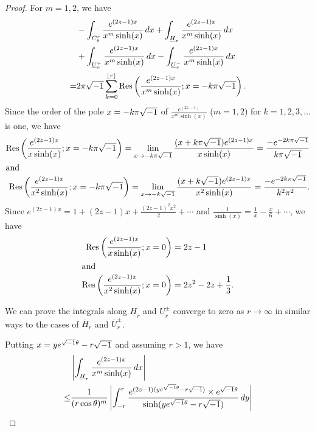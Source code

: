 \begin{proof}
\par
For $m=1,2$, we have
\begin{equation}\label{eq:L1_residue_negative}
\begin{split}
  &-\int_{C_{\theta}^{r}}\frac{e^{(2z-1)x}}{x^m\sinh(x)}\,dx
  +
  \int_{\underline{H}_{r}}\frac{e^{(2z-1)x}}{x^m\sinh(x)}\,dx
  \\
  &+
  \int_{\underline{U}_{r}^{+}}\frac{e^{(2z-1)x}}{x^m\sinh(x)}\,dx
  -
  \int_{\underline{U}_{r}^{-}}\frac{e^{(2z-1)x}}{x^m\sinh(x)}\,dx
  \\
  =&
  2\pi\sqrt{-1}
  \sum_{k=0}^{\lfloor{r}\rfloor}
  \operatorname{Res}\left(\frac{e^{(2z-1)x}}{x^m\sinh(x)};x=-k\pi\sqrt{-1}\right).
\end{split}
\end{equation}
Since the order of the pole $x=-k\pi\sqrt{-1}$ of $\frac{e^{(2z-1)}}{x^m\sinh(x)}$ ($m=1,2$) for $k=1,2,3,\dots$ is one, we have
\begin{align*}
  \operatorname{Res}\left(\frac{e^{(2z-1)x}}{x\sinh(x)};x=-k\pi\sqrt{-1}\right)
  =
  \lim_{x\to-k\pi\sqrt{-1}}\frac{(x+k\pi\sqrt{-1})e^{(2z-1)x}}{x\sinh(x)}
  =
  \frac{-e^{-2k\pi\sqrt{-1}}}{k\pi\sqrt{-1}}
  \\
  \intertext{and}
  \operatorname{Res}\left(\frac{e^{(2z-1)x}}{x^2\sinh(x)};x=-k\pi\sqrt{-1}\right)
  =
  \lim_{x\to-k\sqrt{-1}}\frac{(x+k\sqrt{-1})e^{(2z-1)x}}{x^2\sinh(x)}
  =
  \frac{-e^{-2k\pi\sqrt{-1}}}{k^2\pi^2}.
\end{align*}
Since $e^{(2z-1)x}=1+(2z-1)x+\frac{(2z-1)^2x^2}{2}+\cdots$ and $\frac{1}{\sinh(x)}=\frac{1}{x}-\frac{x}{6}+\cdots$, we have
\begin{align*}
  \operatorname{Res}\left(\frac{e^{(2z-1)x}}{x\sinh(x)};x=0\right)
  &=
  2z-1
  \\
  \intertext{and}
  \operatorname{Res}\left(\frac{e^{(2z-1)x}}{x^2\sinh(x)};x=0\right)
  &=
  2z^2-2z+\frac{1}{3}.
\end{align*}
\par
We can prove the integrals along $\underline{H}_r$ and $\underline{U}_{r}^{\pm}$ converge to zero as $r\to\infty$ in similar ways to the cases of $\overline{H}_r$ and $\overline{U}_{r}^{\pm}$.
\par
Putting $x=ye^{\sqrt{-1}\theta}-r\sqrt{-1}$ and assuming $r>1$, we have
\begin{equation*}
\begin{split}
  &\left|\int_{\underline{H}_{r}}\frac{e^{(2z-1)x}}{x^m\sinh(x)}\,dx\right|
  \\
  \le&
  \frac{1}{(r\cos\theta)^m}
  \left|
    \int_{-r}^{r}
    \frac{e^{(2z-1)(ye^{\i\theta}-r\i)}\times e^{\i\theta}}
         {\sinh(ye^{\i\theta}-r\i)}\,dy
  \right|
  \\

\end{split}
\end{equation*}
\end{proof}
